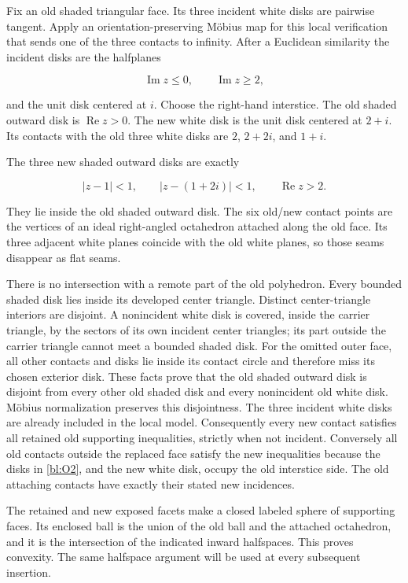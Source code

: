 Fix an old shaded triangular face. Its three incident white disks
are pairwise tangent. Apply an orientation-preserving Möbius map for
this local verification that sends one of the three contacts to
infinity. After a Euclidean similarity the incident disks are the
halfplanes

\[
\operatorname{Im}z\le0,\qquad \operatorname{Im}z\ge2,
\]

and the unit disk centered at \(i\). Choose the right-hand
interstice. The old shaded outward disk is \(\operatorname{Re}z>0\).
The new white disk is the unit disk centered at \(2+i\). Its contacts
with the old three white disks are \(2\), \(2+2i\), and \(1+i\).

The three new shaded outward disks are exactly

\begin{equation}\label{bl:O2}
|z-1|<1,\qquad |z-(1+2i)|<1,
\qquad \operatorname{Re}z>2.
\end{equation}

They lie inside the old shaded outward disk. The six old/new contact
points are the vertices of an ideal right-angled octahedron attached
along the old face. Its three adjacent white planes coincide with
the old white planes, so those seams disappear as flat seams.

There is no intersection with a remote part of the old polyhedron.
Every bounded shaded disk lies inside its developed center triangle.
Distinct center-triangle interiors are disjoint. A nonincident white
disk is covered, inside the carrier triangle, by the sectors of its own
incident center triangles; its part outside the carrier triangle cannot
meet a bounded shaded disk. For the omitted outer face, all other
contacts and disks lie inside its contact circle and therefore miss
its chosen exterior disk. These facts prove that the old shaded
outward disk is disjoint from every other old shaded disk and every
nonincident old white disk. Möbius normalization preserves this
disjointness. The three incident white disks are already included in
the local model. Consequently every new contact satisfies all retained
old supporting inequalities, strictly when not incident. Conversely
all old contacts outside the replaced face satisfy the new inequalities
because the disks in \eqref{bl:O2}, and the new white disk, occupy the old
interstice side. The old attaching contacts have exactly their stated
new incidences.

The retained and new exposed facets make a closed labeled sphere of
supporting faces. Its enclosed ball is the union of the old ball and
the attached octahedron, and it is the intersection of the indicated
inward halfspaces. This proves convexity. The same halfspace argument
will be used at every subsequent insertion.

